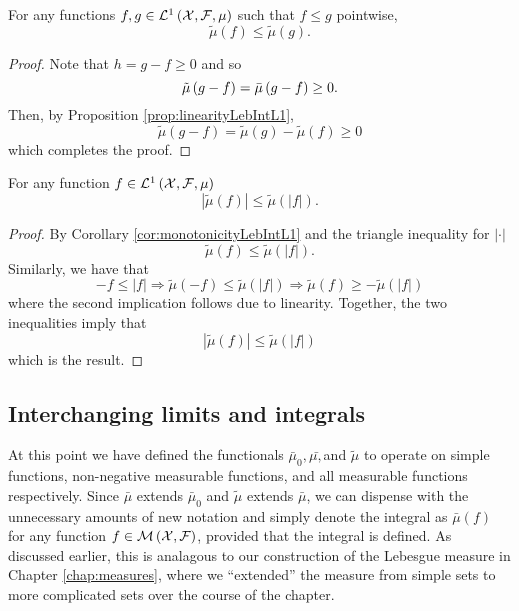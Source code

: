 \begin{cor}
\label{cor:monotonicityLebIntL1}For any functions $f,g\in\mathcal{L}^{1}\left(\mathcal{X},\mathcal{F},\mu\right)$
such that $f\leq g$ pointwise,
\[
\tilde{\mu}\left(f\right)\leq\tilde{\mu}\left(g\right).
\]
\end{cor}

\begin{proof}
Note that $h=g-f\geq0$ and so 
\[
\tilde{\mu}\left(g-f\right)=\bar{\mu}\left(g-f\right)\geq0.
\]
Then, by Proposition \ref{prop:linearityLebIntL1}, 
\[
\tilde{\mu}\left(g-f\right)=\tilde{\mu}\left(g\right)-\tilde{\mu}\left(f\right)\geq0
\]
which completes the proof.
\end{proof}
\begin{cor}
\label{cor:triangleIneqLebIntL1}For any function $f\in\mathcal{L}^{1}\left(\mathcal{X},\mathcal{F},\mu\right)$
\[
\left|\tilde{\mu}\left(f\right)\right|\leq\tilde{\mu}\left(\left|f\right|\right).
\]
\end{cor}

\begin{proof}
By Corollary \ref{cor:monotonicityLebIntL1} and the triangle inequality
for $\left|\cdot\right|$
\[
\tilde{\mu}\left(f\right)\leq\tilde{\mu}\left(\left|f\right|\right).
\]
Similarly, we have that
\[
-f\leq\left|f\right|\Longrightarrow\tilde{\mu}\left(-f\right)\leq\tilde{\mu}\left(\left|f\right|\right)\Longrightarrow\tilde{\mu}\left(f\right)\geq-\tilde{\mu}\left(\left|f\right|\right)
\]
where the second implication follows due to linearity. Together, the
two inequalities imply that
\[
\left|\tilde{\mu}\left(f\right)\right|\leq\tilde{\mu}\left(\left|f\right|\right)
\]
which is the result.
\end{proof}

\subsection{Interchanging limits and integrals}

At this point we have defined the functionals $\bar{\mu}_{0},\bar{\mu,}$and
$\tilde{\mu}$ to operate on simple functions, non-negative measurable
functions, and all measurable functions respectively. Since $\bar{\mu}$
extends $\bar{\mu}_{0}$ and $\tilde{\mu}$ extends $\bar{\mu}$,
we can dispense with the unnecessary amounts of new notation and simply
denote the integral as $\bar{\mu}\left(f\right)$ for any function
$f\in\mathcal{M}\left(\mathcal{X},\mathcal{F}\right)$, provided that the integral is defined.
As discussed earlier, this is analagous to our construction of the
Lebesgue measure in Chapter \ref{chap:measures}, where we ``extended''
the measure from simple sets to more complicated sets over the course
of the chapter.


